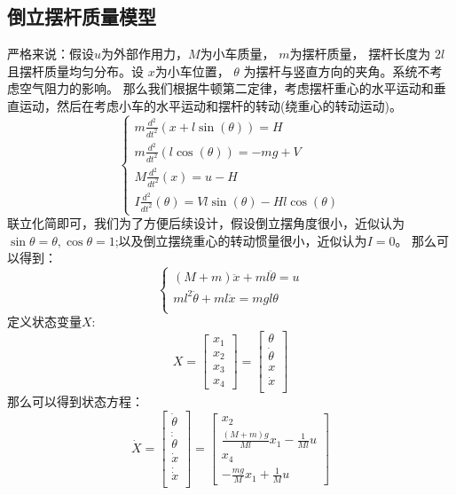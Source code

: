 \documentclass{article}
\begin{document}
\subsection*{倒立摆杆质量模型}
严格来说：假设$u$为外部作用力，$M$为小车质量， $m$为摆杆质量，
摆杆长度为 $2l$且摆杆质量均匀分布。设 $x$为小车位置， 
$ \theta$ 为摆杆与竖直方向的夹角。系统不考虑空气阻力的影响。
那么我们根据牛顿第二定律，考虑摆杆重心的水平运动和垂直运动，然后在考虑小车的水平运动和摆杆的转动(绕重心的转动运动)。
\[
\left\{\begin{matrix}
    m\frac{d^2}{dt^2}(x+l\sin(\theta)) = H \\
    m\frac{d^2}{dt^2}(l\cos(\theta)) = -mg + V \\
    M\frac{d^2}{dt^2}(x) = u - H \\
    I\frac{d^2}{dt^2}(\theta) = Vl\sin(\theta) - Hl\cos(\theta)
\end{matrix}\right.
\]
联立化简即可，我们为了方便后续设计，假设倒立摆角度很小，近似认为\(\sin\theta=\theta,\cos\theta=1\);以及倒立摆绕重心的转动惯量很小，近似认为\(I=0\)。
那么可以得到：
\[
\left\{
    \begin{matrix}
        (M+m)\ddot{x} + ml\ddot{\theta} = u \\
        ml^2\ddot{\theta} + ml\ddot{x} = mgl\theta \\
    \end{matrix}
\right.
\]
定义状态变量$X$:
\[
X = \begin{bmatrix}
    x_1\\x_2\\x_3\\x_4
\end{bmatrix} = \begin{bmatrix}
    \theta \\ \dot{\theta}\\x \\ \dot{x} \\ 
\end{bmatrix}
\]
那么可以得到状态方程：
\[
\dot{X} = \begin{bmatrix}
    \dot{\theta} \\ \dot{\dot{\theta}}\\ \dot{x} \\ \dot{\dot{x}} \\ 
\end{bmatrix} = \begin{bmatrix} x_2\\\frac{(M+m)g}{Ml}x_1-\frac{1}{Ml}u\\x_4\\-\frac{mg}{M}x_1+\frac{1}{M}u \end{bmatrix}
\]
\end{document}
